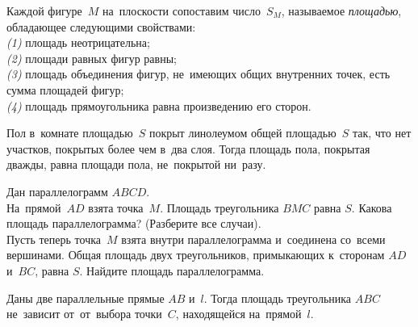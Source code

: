 


Каждой фигуре~$M$ на~плоскости сопоставим число~$S_{M}$, называемое
\emph{площадью}, обладающее следующими свойствами:
\\
\emph{(1)}\enspace
площадь неотрицательна;
\\
\emph{(2)}\enspace
площади равных фигур равны;
\\
\emph{(3)}\enspace
площадь объединения фигур, не~имеющих общих внутренних точек, есть сумма
площадей фигур;
\\
\emph{(4)}\enspace
площадь прямоугольника равна произведению его сторон.

Пол в~комнате площадью~$S$ покрыт линолеумом общей площадью~$S$ так, что нет
участков, покрытых более чем в~два слоя.
Тогда площадь пола, покрытая дважды, равна площади пола, не~покрытой ни~разу.

\begin{problems}

\item
Дан параллелограмм $ABCD$.
\\
\subproblem
На~прямой~$AD$ взята точка~$M$.
Площадь треугольника $BMC$ равна $S$.
Какова площадь параллелограмма?
(Разберите все случаи).
\\
\subproblem
Пусть теперь точка~$M$ взята внутри параллелограмма и~соединена со~всеми
вершинами.
Общая площадь двух треугольников, примыкающих к~сторонам $AD$ и~$BC$,
равна $S$.
Найдите площадь параллелограмма.

\end{problems}

Даны две параллельные прямые $AB$ и~$l$.
Тогда площадь треугольника $ABC$ не~зависит от~от~выбора точки~$C$, находящейся
на~прямой~$l$.

